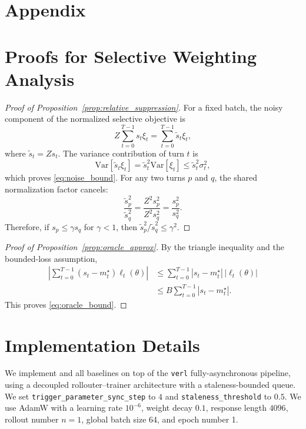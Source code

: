 \appendix
\section*{Appendix}



\section{Proofs for Selective Weighting Analysis}
\label{sec:appendix_theory}

\begin{proof}[Proof of Proposition~\ref{prop:relative_suppression}]
For a fixed batch, the noisy component of the normalized selective objective is
\[
    Z\sum_{t=0}^{T-1}s_t\xi_t
    =
    \sum_{t=0}^{T-1}\widetilde{s}_t\xi_t,
\]
where $\widetilde{s}_t=Zs_t$.
%
The variance contribution of turn $t$ is
\[
    \mathrm{Var}[\widetilde{s}_t\xi_t]
    =
    \widetilde{s}_t^2\mathrm{Var}[\xi_t]
    \leq
    \widetilde{s}_t^2\sigma_t^2,
\]
which proves \eqref{eq:noise_bound}.
%
For any two turns $p$ and $q$, the shared normalization factor cancels:
\[
    \frac{\widetilde{s}_p^2}{\widetilde{s}_q^2}
    =
    \frac{Z^2s_p^2}{Z^2s_q^2}
    =
    \frac{s_p^2}{s_q^2}.
\]
%
Therefore, if $s_p\leq\gamma s_q$ for $\gamma<1$, then $\widetilde{s}_p^2/\widetilde{s}_q^2\leq\gamma^2$.
\end{proof}

\begin{proof}[Proof of Proposition~\ref{prop:oracle_approx}]
By the triangle inequality and the bounded-loss assumption,
\[
\begin{aligned}
\left|
\sum_{t=0}^{T-1}
(s_t-m_t^\star)\ell_t(\theta)
\right|
&\leq
\sum_{t=0}^{T-1}
|s_t-m_t^\star|\,|\ell_t(\theta)| \\
&\leq
B\sum_{t=0}^{T-1}
|s_t-m_t^\star|.
\end{aligned}
\]
%
This proves \eqref{eq:oracle_bound}.
\end{proof}

\section{Implementation Details}
\label{sec:implementation_details}


We implement \ours{} and all baselines on top of the \texttt{verl} fully-asynchronous pipeline, using a decoupled rollouter--trainer architecture with a staleness-bounded queue. We set \texttt{trigger\_parameter\_sync\_step} to $4$ and \texttt{staleness\_threshold} to $0.5$. We use AdamW with a learning rate $10^{-6}$, weight decay $0.1$, response length $4096$, rollout number $n=1$, global batch size 64, and epoch number 1. 

